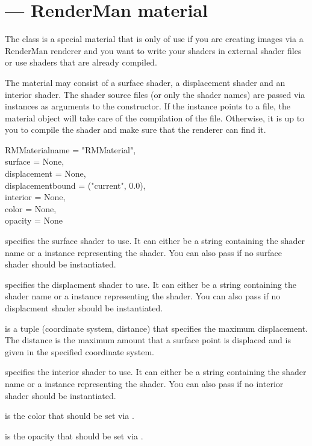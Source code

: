 
\section{ ---
         RenderMan material}

The  class is a special material that is only of
use if you are creating images via a RenderMan renderer and you want
to write your shaders in external shader files or use shaders that
are already compiled.

The material may consist of a surface shader, a displacement shader
and an interior shader. The shader source files (or only the shader
names) are passed via  instances as arguments to the
constructor. If the  instance points to a file, the
material object will take care of the compilation of the
file. Otherwise, it is up to you to compile the shader and make sure
that the renderer can find it.

\begin{classdesc}{RMMaterial}{name = "RMMaterial", \\
                              surface = None,\\
                              displacement = None,\\
                              displacementbound = ("current", 0.0),\\
                              interior = None,\\
                              color = None,\\
                              opacity = None
                             }


 specifies the surface shader to use. It can either be
a string containing the shader name or a  instance
representing the shader. You can also pass  if no surface
shader should be instantiated.

 specifies the displacment shader to use. It can either be
a string containing the shader name or a  instance
representing the shader. You can also pass  if no displacment
shader should be instantiated.

 is a tuple (coordinate system, distance) that
specifies the maximum displacement. The distance is the maximum amount that
a surface point is displaced and  is given in the specified coordinate 
system.

 specifies the interior shader to use. It can either be
a string containing the shader name or a  instance
representing the shader. You can also pass  if no interior
shader should be instantiated.

 is the color that should be set via .

 is the opacity that should be set via .
\end{classdesc}


